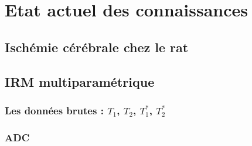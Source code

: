 \section{Etat actuel des connaissances}

\subsection{Isch\'emie c\'er\'ebrale chez le rat}


\subsection{IRM multiparam\'etrique}


\setcounter{subsubsection}{-1}
\subsubsection{Les donn\'ees brutes : $T_1$, $T_2$, $T^{\ast}_1$, $T^{\ast}_2$}




\subsubsection{ADC}